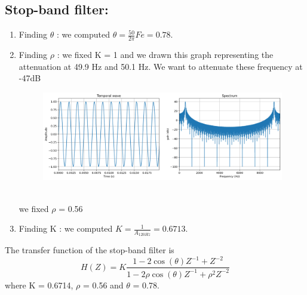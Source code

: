 \documentclass[]{article}
\begin{document}
\subsection*{Stop-band filter:}
\begin{enumerate}
    \item Finding $\theta$ : we computed $\theta = \frac{50}{2\pi}Fe = 0.78$.
    \item Finding $\rho$ : we fixed K = 1 and we drawn this graph representing the attenuation at 49.9 Hz and 50.1 Hz. We want to attenuate these frequency at -47dB
    \begin{figure}[h]
        \centering
        \includegraphics[scale=0.25]{q1.png}
    \end{figure}\\
    we fixed $\rho$ = 0.56
    \item Finding K : we computed $K = \frac{1}{A_{120Hz}}=0.6713$.
\end{enumerate}
The transfer function of the stop-band filter is 
$$H(Z) = K\frac{1 - 2\cos{(\theta)} Z^{-1} + Z^{-2}}{1 - 2\rho \cos{(\theta)Z^{-1} +\rho^2Z^{-2}}}$$
where K = 0.6714, $\rho$ = 0.56 and $\theta$ = 0.78.
\end{document}
